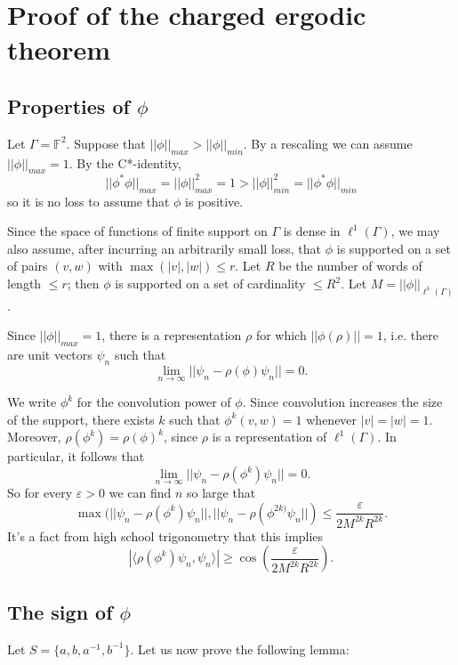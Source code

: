\documentclass[reqno,12pt,letterpaper]{amsart}
\theoremstyle{definition}
\newcommand{\F}{\mathbb F}
\begin{document}
\section{Proof of the charged ergodic theorem}
\label{sec:orgcd1e76f}

\subsection{Properties of \(\phi\)}
\label{sec:orgaf9d325}

Let \(\Gamma = \F^2\).
Suppose that \(||\phi||_{max} > ||\phi||_{min}\). By a rescaling we can assume \(||\phi||_{max} = 1\).
By the C*-identity,
$$||\phi^*\phi||_{max} = ||\phi||_{max}^2 = 1 > ||\phi||_{min}^2 = ||\phi^*\phi||_{min}$$
so it is no loss to assume that \(\phi\) is positive.

Since the space of functions of finite support on \(\Gamma\) is dense in \(\ell^1(\Gamma)\), we may also assume, after incurring an arbitrarily small loss, that \(\phi\) is supported on a set of pairs \((v, w)\) with \(\max(|v|, |w|) \leq r\).
Let \(R\) be the number of words of length \(\leq r\); then \(\phi\) is supported on a set of cardinality \(\leq R^2\).
Let \(M = ||\phi||_{\ell^1(\Gamma)}\).

Since \(||\phi||_{max} = 1\), there is a representation \(\rho\) for which \(||\phi(\rho)|| = 1\), i.e. there are unit vectors \(\psi_n\) such that
$$\lim_{n \to \infty} ||\psi_n - \rho(\phi)\psi_n|| = 0.$$

We write \(\phi^k\) for the convolution power of \(\phi\).
Since convolution increases the size of the support, there exists \(k\) such that \(\phi^k(v, w) = 1\) whenever \(|v| = |w| = 1\).
Moreover, \(\rho(\phi^k) = \rho(\phi)^k\), since \(\rho\) is a representation of \(\ell^1(\Gamma)\).
In particular, it follows that
$$\lim_{n \to \infty} ||\psi_n - \rho(\phi^k)\psi_n|| = 0.$$
So for every \(\varepsilon > 0\) we can find \(n\) so large that
$$\max(||\psi_n - \rho(\phi^k)\psi_n||, ||\psi_n - \rho(\phi^{2k)}\psi_n||) \leq \frac{\varepsilon}{2M^{2k}R^{2k}}.$$
It's a fact from high school trigonometry that this implies
$$|\langle \rho(\phi^k)\psi_n, \psi_n\rangle| \geq \cos\left(\frac{\varepsilon}{2M^{2k}R^{2k}}\right).$$

\subsection{The sign of \(\phi\)}
\label{sec:org9cd1023}

Let \(S = \{a, b, a^{-1}, b^{-1}\}\).
Let us now prove the following lemma:
\end{document}
